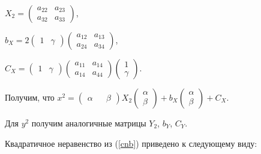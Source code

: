 \documentclass[pdftex,ptm,12pt,a4paper]{report}
\begin{document}
        $X_2 = \begin{pmatrix}
              a_{22} & a_{23} \\
              a_{32} & a_{33}
        \end{pmatrix}$,

        $b_X = 2\begin{pmatrix} 1 & \gamma \end{pmatrix}
          \begin{pmatrix}
              a_{12} & a_{13} \\
              a_{24} & a_{34}
        \end{pmatrix}$,

        $C_X = \begin{pmatrix} 1 & \gamma \end{pmatrix}
          \begin{pmatrix}
              a_{11} & a_{14} \\
              a_{14} & a_{44}
        \end{pmatrix}
        \begin{pmatrix} 1 \\ \gamma \end{pmatrix}$.

      Получим, что
      $x^2 = \begin{pmatrix} \alpha && \beta \end{pmatrix}
               X_2
             \begin{pmatrix} \alpha \\ \beta \end{pmatrix} +
             b_X \begin{pmatrix} \alpha \\ \beta \end{pmatrix}  +
             C_X$.

      Для $y^2$ получим аналогичные матрицы $Y_2$, $b_Y$, $C_Y$.

      Квадратичное неравенство из (\ref{cnb}) приведено к следующему виду:
\end{document}
